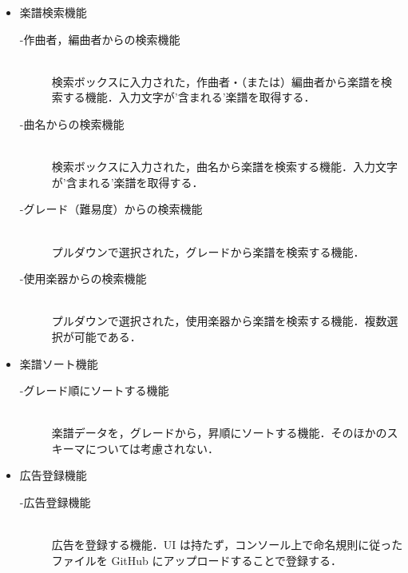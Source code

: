 \begin{itemize}
    \item 楽譜検索機能
          \begin{description}
              \item[-作曲者，編曲者からの検索機能]\mbox{}\\
              検索ボックスに入力された，作曲者・（または）編曲者から楽譜を検索する機能．入力文字が'含まれる'楽譜を取得する．
              \item[-曲名からの検索機能] \mbox{}\\
                  検索ボックスに入力された，曲名から楽譜を検索する機能．入力文字が'含まれる'楽譜を取得する．
              \item[-グレード（難易度）からの検索機能] \mbox{}\\
                  プルダウンで選択された，グレードから楽譜を検索する機能．
              \item[-使用楽器からの検索機能] \mbox{}\\
                  プルダウンで選択された，使用楽器から楽譜を検索する機能．複数選択が可能である．
          \end{description}
    \item 楽譜ソート機能
          \begin{description}
              \item[-グレード順にソートする機能] \mbox{}\\
                  楽譜データを，グレードから，昇順にソートする機能．そのほかのスキーマについては考慮されない．
          \end{description}
    \item 広告登録機能
          \begin{description}
              \item[-広告登録機能]\mbox{}\\
              広告を登録する機能．UI は持たず，コンソール上で命名規則に従ったファイルを
              GitHub にアップロードすることで登録する．
          \end{description}
\end{itemize}